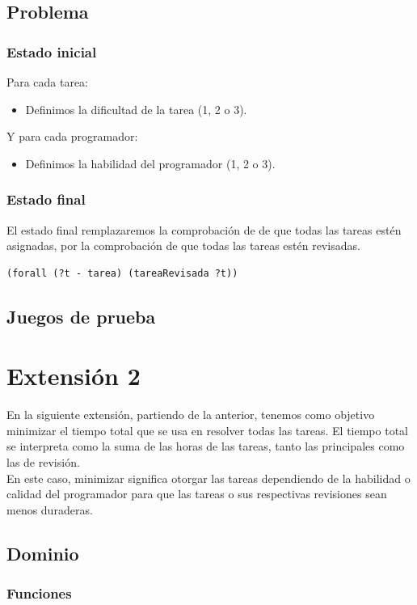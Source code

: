 \documentclass[11pt]{article}
\begin{document}
\subsection{Problema}
\subsubsection{Estado inicial}

Para cada tarea:
\begin{itemize}
  	\item Definimos la dificultad de la tarea (1, 2 o 3).
\end{itemize}

\noindent
Y para cada programador:
\begin{itemize}
  	\item Definimos la habilidad del programador (1, 2 o 3).
\end{itemize}

\subsubsection{Estado final}

El estado final remplazaremos la comprobación de de que todas las tareas estén asignadas, por la comprobación de que todas las tareas estén revisadas.
\begin{verbatim}
(forall (?t - tarea) (tareaRevisada ?t))
\end{verbatim}
\subsection{Juegos de prueba}

\section{Extensión 2}
En la siguiente extensión, partiendo de la anterior, tenemos como objetivo minimizar el tiempo total que se usa en resolver todas las tareas. El tiempo total se interpreta como la suma de las horas de las tareas, tanto las principales como las de revisión. 
\\
En este caso, minimizar significa otorgar las tareas dependiendo de la habilidad o calidad del programador para que las tareas o sus respectivas revisiones sean menos duraderas. 
\subsection{Dominio}
\subsubsection{Funciones}
\end{document}
